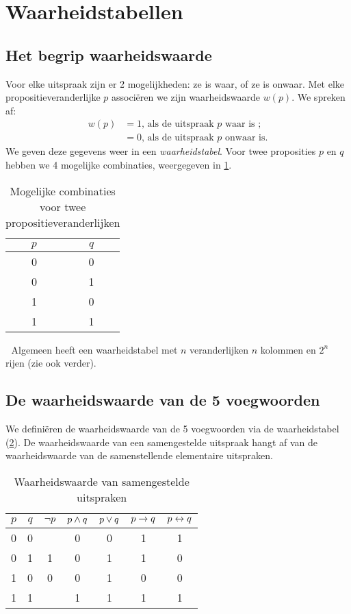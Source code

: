 \section{Waarheidstabellen}
  \subsection{Het begrip waarheidswaarde}
Voor elke uitspraak zijn er 2 mogelijkheden: ze is waar, of ze is onwaar. Met elke propositieveranderlijke $p$ associ\"{e}ren we zijn waarheidswaarde $w(p)$. We spreken af:
\begin{displaymath}
\begin{array}{rl }
    w(p)  & = 1 \mbox{, als de uitspraak } p \mbox{ waar is };  \\
      &  = 0 \mbox{, als de uitspraak } p \mbox{ onwaar is.}
\end{array}
  \end{displaymath}
We geven deze gegevens weer in een \emph{waarheidstabel}. Voor twee proposities $p$ en $q$ hebben we 4 mogelijke combinaties, weergegeven in \cref{tbl:waarheid}.
\begin{table}[htb]
  \centering
  \caption{Mogelijke combinaties voor twee propositieveranderlijken}\label{tbl:waarheid}
\begin{tabular}{cc}
\toprule
$p$  & $q$  \\ \midrule
0  & 0  \\
0  & 1 \\
1  & 0 \\
1  & 1 \\
\bottomrule
\end{tabular}
\end{table}
\noindent
Algemeen heeft een waarheidstabel met $n$ veranderlijken $n$ kolommen en $2^{n}$ rijen (zie ook verder).

\subsection{De waarheidswaarde van de 5 voegwoorden}
We defini\"{e}ren de waarheidswaarde van de 5 voegwoorden via de waarheidstabel (\cref{tbl:waarheidvoegwoorden}). De waarheidswaarde van een samengestelde uitspraak hangt af van de waarheidswaarde van de samenstellende elementaire uitspraken.

\begin{table}[htb]
  \centering
  \caption{Waarheidswaarde van samengestelde uitspraken}\label{tbl:waarheidvoegwoorden}
\begin{tabular}{ccccccc}
\toprule
 $p$  & $q$ & $\neg p$ & $p \wedge q$ & $p \vee q$ & $p \rightarrow q$ & $p \leftrightarrow q$ \\
\midrule
  0 & 0 & & 0 & 0 & 1 & 1\\
  0 & 1 & 1 & 0 & 1 & 1 & 0\\
  1 & 0 & 0 & 0 & 1 & 0 & 0\\
  1 & 1 &  & 1 & 1 & 1 & 1\\
\bottomrule
\end{tabular}
\end{table}

